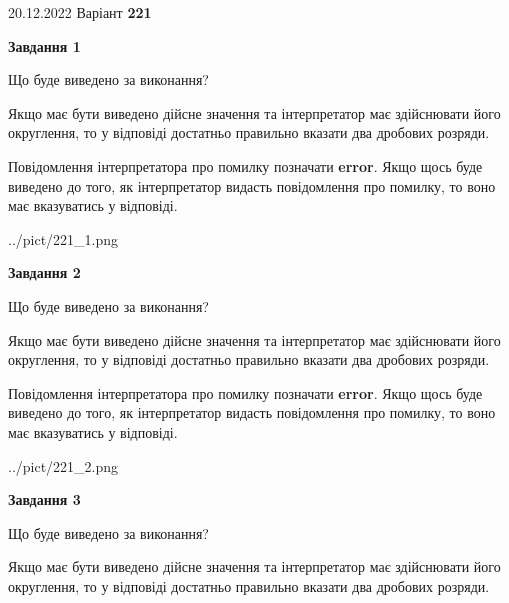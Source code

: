 \documentclass[12pt, ukrainian]{article}
\begin{document}
{20.12.2022 Варіант \No \textbf { 221 }\par}
{
\begin {Large}

{\begin {center}\textbf{Завдання 1}\end {center}}\par
Що буде виведено за виконання? \par

Якщо має бути виведено дійсне значення та інтерпретатор має здійснювати його округлення, 
то у відповіді достатньо правильно вказати два дробових розряди.

Повідомлення інтерпретатора про помилку позначати \textbf{error}.
Якщо щось буде виведено до того, як інтерпретатор видасть повідомлення про помилку, 
то воно має вказуватись у відповіді. \par

\begin{center}
	{../pict/221_1.png}
\end{center}
\newpage

{\begin {center}\textbf{Завдання 2}\end {center}}\par
Що буде виведено за виконання? \par

Якщо має бути виведено дійсне значення та інтерпретатор має здійснювати його округлення, 
то у відповіді достатньо правильно вказати два дробових розряди.

Повідомлення інтерпретатора про помилку позначати \textbf{error}.
Якщо щось буде виведено до того, як інтерпретатор видасть повідомлення про помилку, 
то воно має вказуватись у відповіді. \par

\begin{center}
	{../pict/221_2.png}
\end{center}
\newpage

{\begin {center}\textbf{Завдання 3}\end {center}}\par
Що буде виведено за виконання? \par

Якщо має бути виведено дійсне значення та інтерпретатор має здійснювати його округлення, 
то у відповіді достатньо правильно вказати два дробових розряди.


\end{Large}}
\end{document}
